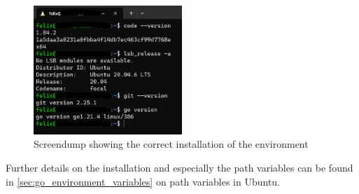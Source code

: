 \begin{figure}[H]
	\centering
	\includegraphics[width=0.5\textwidth]{figures/goLang/installation_screendump.png}
	\caption{Screendump showing the correct installation of the environment}
	\label{fig:screendump_installation}
\end{figure}

Further details on the installation and especially the path variables can be found in \autoref{sec:go_environment_variables} on path variables in Ubuntu.